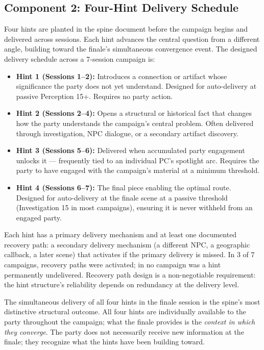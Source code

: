 \subsection{Component 2: Four-Hint Delivery Schedule}

Four hints are planted in the spine document before the campaign begins and
delivered across sessions. Each hint advances the central question from a
different angle, building toward the finale's simultaneous convergence event.
The designed delivery schedule across a 7-session campaign is:

\begin{itemize}
  \item \textbf{Hint 1 (Sessions 1--2):} Introduces a connection or artifact
    whose significance the party does not yet understand. Designed for
    auto-delivery at passive Perception 15+. Requires no party action.

  \item \textbf{Hint 2 (Sessions 2--4):} Opens a structural or historical
    fact that changes how the party understands the campaign's central problem.
    Often delivered through investigation, NPC dialogue, or a secondary
    artifact discovery.

  \item \textbf{Hint 3 (Sessions 5--6):} Delivered when accumulated party
    engagement unlocks it --- frequently tied to an individual PC's spotlight
    arc. Requires the party to have engaged with the campaign's material
    at a minimum threshold.

  \item \textbf{Hint 4 (Sessions 6--7):} The final piece enabling the
    optimal route. Designed for auto-delivery at the finale scene at a
    passive threshold (Investigation 15 in most campaigns), ensuring
    it is never withheld from an engaged party.
\end{itemize}

Each hint has a primary delivery mechanism and at least one documented recovery
path: a secondary delivery mechanism (a different NPC, a geographic callback,
a later scene) that activates if the primary delivery is missed. In 3 of 7
campaigns, recovery paths were activated; in no campaign was a hint permanently
undelivered. Recovery path design is a non-negotiable requirement: the hint
structure's reliability depends on redundancy at the delivery level.

The simultaneous delivery of all four hints in the finale session is the spine's
most distinctive structural outcome. All four hints are individually available
to the party throughout the campaign; what the finale provides is the
\textit{context in which they converge}. The party does not necessarily receive
new information at the finale; they recognize what the hints have been building toward.

